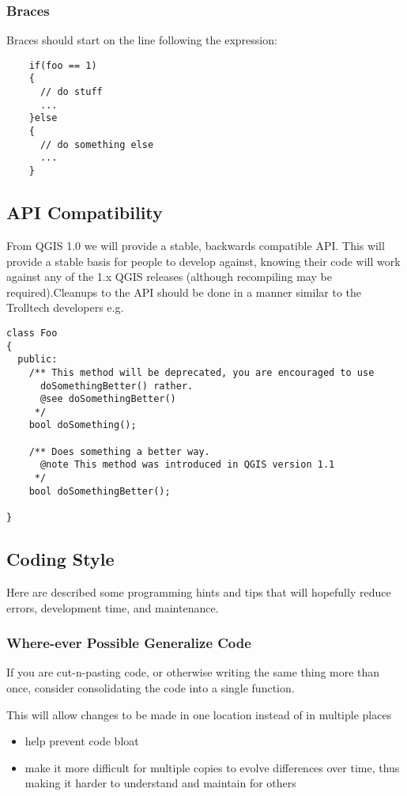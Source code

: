 \subsubsection{Braces}
Braces should start on the line following the expression:

\begin{verbatim}
	if(foo == 1)
	{
	  // do stuff
	  ...
 	}else
	{
	  // do something else
	  ...
	}
\end{verbatim}

\subsection{API Compatibility}
From QGIS 1.0 we will provide a stable, backwards compatible API. This will
provide a stable basis for people to develop against, knowing their code will
work against any of the 1.x QGIS releases (although recompiling may be
required).Cleanups to the API should be done in a manner similar to the
Trolltech developers e.g.

\begin{verbatim}
class Foo 
{
  public:
    /** This method will be deprecated, you are encouraged to use 
      doSomethingBetter() rather.
      @see doSomethingBetter()
     */
    bool doSomething();

    /** Does something a better way.
      @note This method was introduced in QGIS version 1.1
     */
    bool doSomethingBetter();

}
\end{verbatim}

\subsection{Coding Style}
Here are described some programming hints and tips that will hopefully reduce errors, development time, and maintenance.

\subsubsection{Where-ever Possible Generalize Code}

If you are cut-n-pasting code, or otherwise writing the same thing more than once, consider consolidating the code 
into a single function.

This will allow changes to be made in one location instead of in multiple places

\begin{itemize}
\item help prevent code bloat
\item make it more difficult for multiple copies to evolve differences over time, thus making it harder to understand and maintain for others
\end{itemize}

